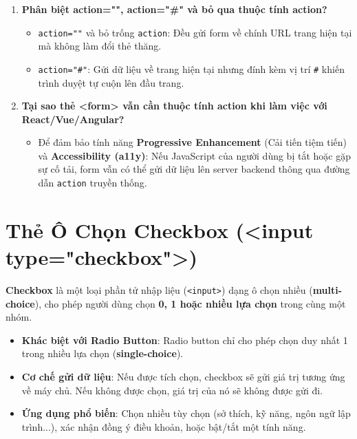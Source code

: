 \documentclass[11pt,oneside]{book}
\newcommand{\codeinline}[1]{\textcolor{accentOrange}{\texttt{#1}}}
\newcommand{\term}[1]{\textbf{\textcolor{primaryBlue}{#1}}}
\begin{document}
\begin{noteBox}
\begin{enumerate}[leftmargin=1.5em, itemsep=3pt, parsep=0pt]
    \item \textbf{Phân biệt action="", action="\#" và bỏ qua thuộc tính action?}
    \begin{itemize}[leftmargin=1.2em, itemsep=2pt]
        \item \codeinline{action=""} và bỏ trống \codeinline{action}: Đều gửi form về chính URL trang hiện tại mà không làm đổi thẻ thăng.
        \item \codeinline{action="\#"}: Gửi dữ liệu về trang hiện tại nhưng đính kèm vị trí \codeinline{\#} khiến trình duyệt tự cuộn lên đầu trang.
    \end{itemize}
    \item \textbf{Tại sao thẻ <form> vẫn cần thuộc tính action khi làm việc với React/Vue/Angular?}
    \begin{itemize}[leftmargin=1.2em, itemsep=2pt]
        \item Để đảm bảo tính năng \textbf{Progressive Enhancement} (Cải tiến tiệm tiến) và \textbf{Accessibility (a11y)}: Nếu JavaScript của người dùng bị tắt hoặc gặp sự cố tải, form vẫn có thể gửi dữ liệu lên server backend thông qua đường dẫn \codeinline{action} truyền thống.
    \end{itemize}
\end{enumerate}
\end{noteBox}

\section[Thẻ Ô Chọn Checkbox]{Thẻ Ô Chọn Checkbox (<input type="checkbox">)}
\label{sec:html_checkbox}

\begin{conceptBox}
\term{Checkbox} là một loại phần tử nhập liệu (\codeinline{<input>}) dạng ô chọn nhiều (\term{multi-choice}), cho phép người dùng chọn \textbf{0, 1 hoặc nhiều lựa chọn} trong cùng một nhóm.
\begin{itemize}[leftmargin=1.5em, itemsep=2pt, parsep=0pt]
    \item \textbf{Khác biệt với Radio Button}: Radio button chỉ cho phép chọn duy nhất 1 trong nhiều lựa chọn (\term{single-choice}).
    \item \textbf{Cơ chế gửi dữ liệu}: Nếu được tích chọn, checkbox sẽ gửi giá trị tương ứng về máy chủ. Nếu không được chọn, giá trị của nó sẽ không được gửi đi.
    \item \textbf{Ứng dụng phổ biến}: Chọn nhiều tùy chọn (sở thích, kỹ năng, ngôn ngữ lập trình...), xác nhận đồng ý điều khoản, hoặc bật/tắt một tính năng.
\end{itemize}
\end{conceptBox}
\end{document}
